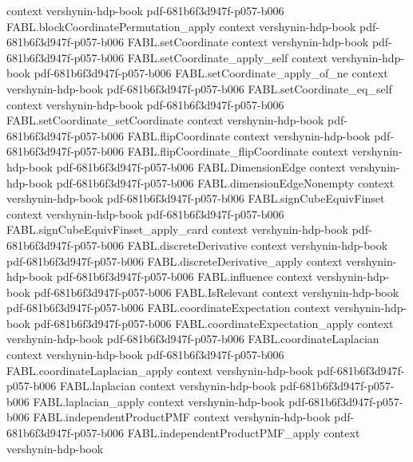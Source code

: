 \begin{theorem}
  {context}
  {vershynin-hdp-book}
  {pdf-681b6f3d947f-p057-b006}
\proofstep
  {FABL.blockCoordinatePermutation_apply}
  {context}
  {vershynin-hdp-book}
  {pdf-681b6f3d947f-p057-b006}
\proofstep
  {FABL.setCoordinate}
  {context}
  {vershynin-hdp-book}
  {pdf-681b6f3d947f-p057-b006}
\proofstep
  {FABL.setCoordinate_apply_self}
  {context}
  {vershynin-hdp-book}
  {pdf-681b6f3d947f-p057-b006}
\proofstep
  {FABL.setCoordinate_apply_of_ne}
  {context}
  {vershynin-hdp-book}
  {pdf-681b6f3d947f-p057-b006}
\proofstep
  {FABL.setCoordinate_eq_self}
  {context}
  {vershynin-hdp-book}
  {pdf-681b6f3d947f-p057-b006}
\proofstep
  {FABL.setCoordinate_setCoordinate}
  {context}
  {vershynin-hdp-book}
  {pdf-681b6f3d947f-p057-b006}
\proofstep
  {FABL.flipCoordinate}
  {context}
  {vershynin-hdp-book}
  {pdf-681b6f3d947f-p057-b006}
\proofstep
  {FABL.flipCoordinate_flipCoordinate}
  {context}
  {vershynin-hdp-book}
  {pdf-681b6f3d947f-p057-b006}
\proofstep
  {FABL.DimensionEdge}
  {context}
  {vershynin-hdp-book}
  {pdf-681b6f3d947f-p057-b006}
\proofstep
  {FABL.dimensionEdgeNonempty}
  {context}
  {vershynin-hdp-book}
  {pdf-681b6f3d947f-p057-b006}
\proofstep
  {FABL.signCubeEquivFinset}
  {context}
  {vershynin-hdp-book}
  {pdf-681b6f3d947f-p057-b006}
\proofstep
  {FABL.signCubeEquivFinset_apply_card}
  {context}
  {vershynin-hdp-book}
  {pdf-681b6f3d947f-p057-b006}
\proofstep
  {FABL.discreteDerivative}
  {context}
  {vershynin-hdp-book}
  {pdf-681b6f3d947f-p057-b006}
\proofstep
  {FABL.discreteDerivative_apply}
  {context}
  {vershynin-hdp-book}
  {pdf-681b6f3d947f-p057-b006}
\proofstep
  {FABL.influence}
  {context}
  {vershynin-hdp-book}
  {pdf-681b6f3d947f-p057-b006}
\proofstep
  {FABL.IsRelevant}
  {context}
  {vershynin-hdp-book}
  {pdf-681b6f3d947f-p057-b006}
\proofstep
  {FABL.coordinateExpectation}
  {context}
  {vershynin-hdp-book}
  {pdf-681b6f3d947f-p057-b006}
\proofstep
  {FABL.coordinateExpectation_apply}
  {context}
  {vershynin-hdp-book}
  {pdf-681b6f3d947f-p057-b006}
\proofstep
  {FABL.coordinateLaplacian}
  {context}
  {vershynin-hdp-book}
  {pdf-681b6f3d947f-p057-b006}
\proofstep
  {FABL.coordinateLaplacian_apply}
  {context}
  {vershynin-hdp-book}
  {pdf-681b6f3d947f-p057-b006}
\proofstep
  {FABL.laplacian}
  {context}
  {vershynin-hdp-book}
  {pdf-681b6f3d947f-p057-b006}
\proofstep
  {FABL.laplacian_apply}
  {context}
  {vershynin-hdp-book}
  {pdf-681b6f3d947f-p057-b006}
\proofstep
  {FABL.independentProductPMF}
  {context}
  {vershynin-hdp-book}
  {pdf-681b6f3d947f-p057-b006}
\proofstep
  {FABL.independentProductPMF_apply}
  {context}
  {vershynin-hdp-book}

\end{theorem}
